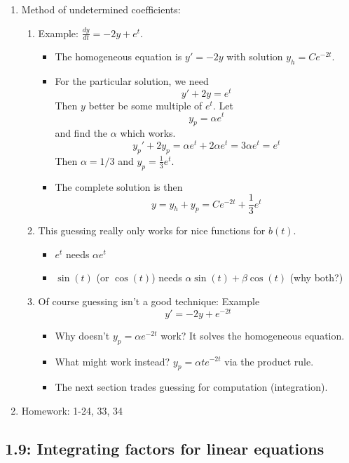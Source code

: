 \documentclass{article}
\newcommand{\ds}{\displaystyle}
\begin{document}
\begin{enumerate}
\item Method of undetermined coefficients:
\begin{enumerate}
\item Example: $\ds \frac{dy}{dt} = -2y + e^t$. 
\begin{itemize}
\item The homogeneous equation is $y'=-2y$ with solution $y_h = Ce^{-2t}$.
\item For the particular solution, we need
\[
y' +2y = e^t
\]
Then $y$ better be some multiple of $e^t$. Let
\[
y_p = \alpha e^t
\]
and find the $\alpha$ which works.
\[
y_p'+2y_p = \alpha e^t +2\alpha e^t = 3 \alpha e^t = e^t
\]
Then $\alpha = 1/3$ and $y_p = \frac{1}{3} e^t$.
\item The complete solution is then 
\[
y = y_h + y_p = Ce^{-2t}+\frac{1}{3}e^t
\]
\end{itemize}
\item This guessing really only works for nice functions for $b(t)$.
\begin{itemize}
\item $e^t$ needs $\alpha e^t$
\item $\sin(t)$ (or $\cos(t)$) needs $\alpha \sin(t)+\beta\cos(t)$ (why both?)
\end{itemize}
\item Of course guessing isn't a good technique: Example
\[
y' = -2y + e^{-2t}
\]
\begin{itemize}
\item Why doesn't $y_p = \alpha e^{-2t}$ work? It solves the homogeneous equation.
\item What might work instead? $y_p = \alpha te^{-2t}$ via the product rule.
\item The next section trades guessing for computation (integration). 
\end{itemize}
\end{enumerate}

\item Homework: 1-24, 33, 34

\end{enumerate}


\subsection{1.9: Integrating factors for linear equations}
\end{document}

